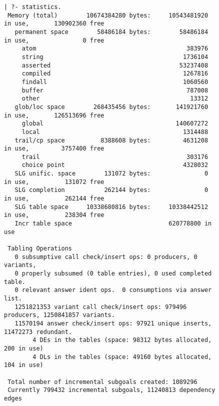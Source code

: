 \begin{description}
\begin{itemize}
\begin{itemize}
\end{itemize}

\begin{figure}[p] \label{fig:statistics}
    {\footnotesize
     \begin{verbatim}
| ?- statistics.
 Memory (total)        10674384280 bytes:     10543481920 in use,       130902360 free
   permanent space        58486184 bytes:        58486184 in use,               0 free
     atom                                          383976
     string                                       1736104
     asserted                                    53237408
     compiled                                     1267816
     findall                                      1060560
     buffer                                        787008
     other                                          13312
   glob/loc space        268435456 bytes:       141921760 in use,       126513696 free
     global                                     140607272
     local                                        1314488
   trail/cp space          8388608 bytes:         4631208 in use,         3757400 free
     trail                                         303176
     choice point                                 4328032
   SLG unific. space        131072 bytes:               0 in use,          131072 free
   SLG completion           262144 bytes:               0 in use,          262144 free
   SLG table space     10338680816 bytes:     10338442512 in use,          238304 free
   Incr table space                           620778800 in use

 Tabling Operations
   0 subsumptive call check/insert ops: 0 producers, 0 variants,
   0 properly subsumed (0 table entries), 0 used completed table.
   0 relevant answer ident ops.  0 consumptions via answer list.
   1251821353 variant call check/insert ops: 979496 producers, 1250841857 variants.
   11570194 answer check/insert ops: 97921 unique inserts, 11472273 redundant.
        4 DEs in the tables (space: 98312 bytes allocated,   200 in use)
        4 DLs in the tables (space: 49160 bytes allocated,   104 in use)

 Total number of incremental subgoals created: 1089296
 Currently 799432 incremental subgoals, 11240813 dependency edges


\end{verbatim}}
\end{figure}
\end{itemize}
\end{description}
